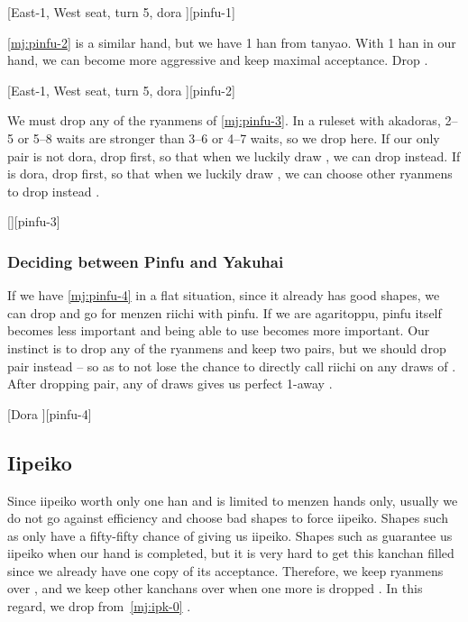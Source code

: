 \documentclass[12pt]{article}
\begin{document}
[East-1, West seat, turn 5, dora ][pinfu-1]

\ref{mj:pinfu-2} is a similar hand, but we have 1 han from tanyao. With 1 han in our hand, we can become more aggressive and keep maximal acceptance. Drop .

[East-1, West seat, turn 5, dora ][pinfu-2]

We must drop any of the ryanmens of \ref{mj:pinfu-3}. In a ruleset with akadoras, 2--5 or 5--8 waits are stronger than 3--6 or 4--7 waits, so we drop  here. If our only pair  is not dora, drop  first, so that when we luckily draw , we can drop  instead. If  is dora, drop  first, so that when we luckily draw , we can choose other ryanmens to drop instead \citep[][pp.~13--14]{kawamura-naki}.

[][pinfu-3]


\subsubsection*{Deciding between Pinfu and Yakuhai}

If we have \ref{mj:pinfu-4} in a flat situation, since it already has good shapes, we can drop  and go for menzen riichi with pinfu. If we are agaritoppu, pinfu itself becomes less important and being able to use  becomes more important. Our instinct is to drop any of the ryanmens and keep two pairs, but we should drop  pair instead -- so as to not lose the chance to directly call riichi on any draws of . After dropping  pair, any of  draws gives us perfect 1-away \citep[][pp.~179--180]{kawamura-naki}.

[Dora ][pinfu-4]


\subsection{Iipeiko} \label{subsec:iipeiko}

Since iipeiko worth only one han and is limited to menzen hands only, usually we do not go against efficiency and choose bad shapes to force iipeiko. Shapes such as  only have a fifty-fifty chance of giving us iipeiko. Shapes such as  guarantee us iipeiko when our hand is completed, but it is very hard to get this  kanchan filled since we already have one copy of its acceptance. Therefore, we keep ryanmens over , and we keep other kanchans over  when one more  is dropped \citep{gendai-ipk}. In this regard, we drop  from~\ref{mj:ipk-0} \citep[][pp.~121--122]{ooi-gundou}.
\end{document}
